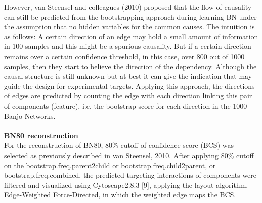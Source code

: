 \documentclass{bioinfo}
\begin{document}
\begin{methods}
However, van Steensel and colleagues (2010) proposed that the flow of causality can still be predicted from the bootstrapping approach during learning BN under the assumption that no hidden variables for the common causes. The intuition is as follows: A certain direction of an edge may hold a small amount of information in 100 samples and this might be a spurious causality. But if a certain direction remains over a certain confidence threshold, in this case, over 800 out of 1000 samples, then they start to believe the direction of the dependency. Although the causal structure is still unknown but at best it can give the indication that may guide the design for experimental targets. Applying this approach, the directions of edges are predicted by counting the edge with each direction linking this pair of components (feature), i.e, the bootstrap score for each direction in the 1000 Banjo Networks. \\
\\
\textbf{BN80 reconstruction}\\
 For the reconstruction of BN80, 80\% cutoff of confidence score (BCS) was selected as previously described in van Steensel, 2010. After applying 80\% cutoff on the bootstrap.freq.parent2child or bootstrap.freq.child2parent, or bootstrap.freq.combined, the predicted targeting interactions of components were filtered and visualized using Cytoscape2.8.3 [9], applying the layout algorithm, Edge-Weighted Force-Directed, in which the weighted edge maps the BCS. 
 

\end{methods}
\end{document}
